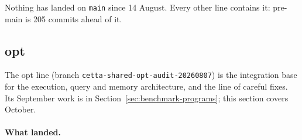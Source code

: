 \documentclass[11pt]{article}
\newcommand{\code}[1]{\texttt{#1}}
\begin{document}
Nothing has landed on \code{main} since 14 August.  Every other line contains
it: pre-main is 205 commits ahead of it.

\subsection{opt}
\label{sec:line-opt}

The opt line (branch \code{cetta-shared-opt-audit-20260807}) is the
integration base for the execution, query and memory architecture, and the
line of careful fixes.  Its September work is in
Section~\ref{sec:benchmark-programs}; this section covers October.

\paragraph{What landed.}
\end{document}
